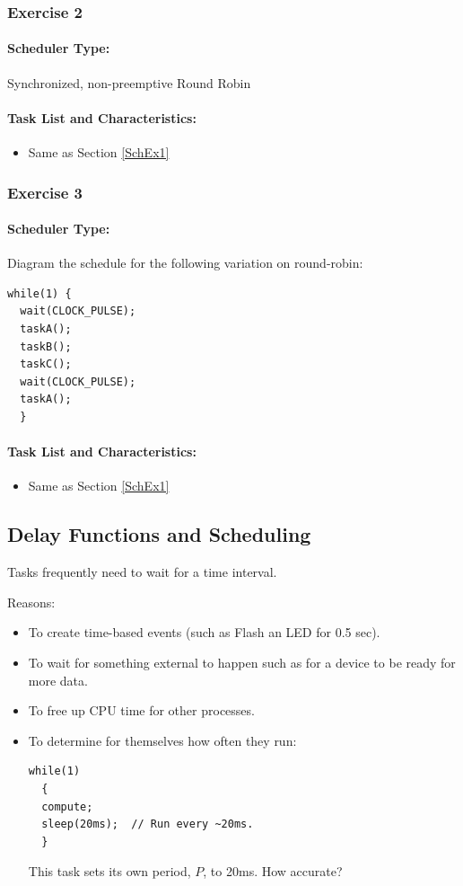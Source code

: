 \documentclass{article}	%
\begin{document}
\subsubsection{Exercise 2}

\paragraph{Scheduler Type:} Synchronized, non-preemptive Round Robin
\paragraph{Task List and Characteristics:} 
\begin{itemize}
\item Same as Section \ref{SchEx1}
\end{itemize}


\subsubsection{Exercise 3}

\paragraph{Scheduler Type:} Diagram the schedule for the following
         variation on round-robin:
\begin{verbatim}
while(1) {
  wait(CLOCK_PULSE);
  taskA();
  taskB();
  taskC();
  wait(CLOCK_PULSE);
  taskA();
  }
\end{verbatim} 
\paragraph{Task List and Characteristics:} 
\begin{itemize}
\item Same as Section \ref{SchEx1}
\end{itemize}


\subsection*{Delay Functions and Scheduling}

Tasks frequently need to wait for a time interval.

Reasons:
\begin{itemize}
  \item To create time-based events (such as Flash an LED for 0.5 sec).
  \item To wait for something external to happen such as for a device to
           be ready for more data.
  \item To free up CPU time for other processes.
  \item To determine for themselves how often they run:
\begin{verbatim}
while(1)
  {
  compute;
  sleep(20ms);  // Run every ~20ms.
  }
\end{verbatim}
This task sets its own period, $P$, to 20ms.
How accurate?

\end{itemize}
\end{document}
